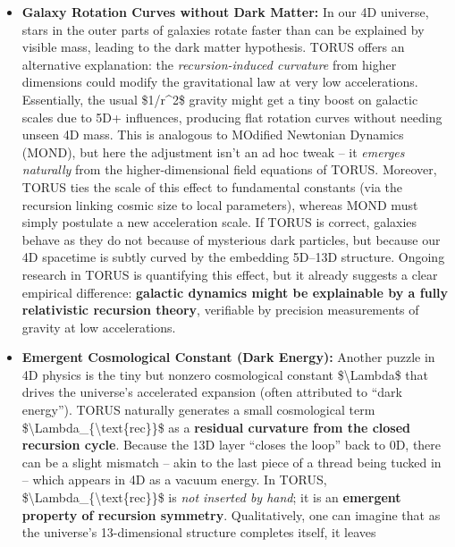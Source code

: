 \documentclass[
]{article}
\begin{document}
{\begin{itemize}
\item
  \textbf{Galaxy Rotation Curves without Dark Matter:} In our 4D
  universe, stars in the outer parts of galaxies rotate faster than can
  be explained by visible mass, leading to the dark matter hypothesis.
  TORUS offers an alternative explanation: the \emph{recursion-induced
  curvature} from higher dimensions could modify the gravitational law
  at very low accelerations\hspace{0pt}. Essentially, the usual
  \$1/r\^{}2\$ gravity might get a tiny boost on galactic scales due to
  5D+ influences, producing flat rotation curves without needing unseen
  4D mass. This is analogous to MOdified Newtonian Dynamics (MOND), but
  here the adjustment isn't an ad hoc tweak -- it \emph{emerges
  naturally} from the higher-dimensional field equations of
  TORUS\hspace{0pt}. Moreover, TORUS ties the scale of this effect to
  fundamental constants (via the recursion linking cosmic size to local
  parameters), whereas MOND must simply postulate a new acceleration
  scale. If TORUS is correct, galaxies behave as they do not because of
  mysterious dark particles, but because our 4D spacetime is subtly
  curved by the embedding 5D--13D structure. Ongoing research in TORUS
  is quantifying this effect, but it already suggests a clear empirical
  difference: \textbf{galactic dynamics might be explainable by a fully
  relativistic recursion theory}, verifiable by precision measurements
  of gravity at low accelerations.
\item
  \textbf{Emergent Cosmological Constant (Dark Energy):} Another puzzle
  in 4D physics is the tiny but nonzero cosmological constant
  \$\textbackslash Lambda\$ that drives the universe's accelerated
  expansion (often attributed to ``dark energy''). TORUS naturally
  generates a small cosmological term
  \$\textbackslash Lambda\_\{\textbackslash text\{rec\}\}\$ as a
  \textbf{residual curvature from the closed recursion
  cycle}\hspace{0pt}. Because the 13D layer ``closes the loop'' back to
  0D, there can be a slight mismatch -- akin to the last piece of a
  thread being tucked in -- which appears in 4D as a vacuum energy. In
  TORUS, \$\textbackslash Lambda\_\{\textbackslash text\{rec\}\}\$ is
  \emph{not inserted by hand}; it is an \textbf{emergent property of
  recursion symmetry}\hspace{0pt}. Qualitatively, one can imagine that
  as the universe's 13-dimensional structure completes itself, it leaves

\end{itemize}}
\end{document}
